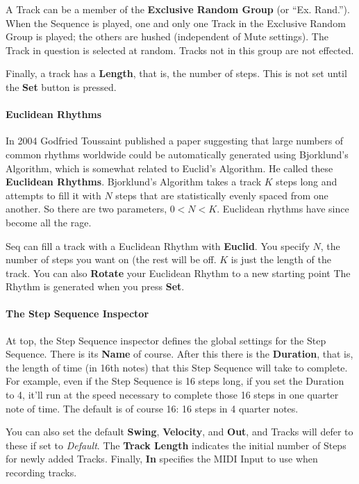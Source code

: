 \documentclass[twoside,10pt]{article}
\begin{document}
A Track can be a member of the {\bf Exclusive Random Group} (or ``Ex. Rand.'').  When the Sequence is played, one and only one Track in the Exclusive Random Group is played; the others are hushed (independent of Mute settings).  The Track in question is selected at random. Tracks not in this group are not effected.

Finally, a track has a {\bf Length}, that is, the number of steps.  This is not set until the {\bf Set} button is pressed.

\paragraph{Euclidean Rhythms}

In 2004 Godfried Toussaint published a paper suggesting that large numbers of common rhythms worldwide could be automatically generated using Bjorklund's Algorithm, which is somewhat related to Euclid's Algorithm.  He called these {\bf Euclidean Rhythms}.  Bjorklund's Algorithm takes a track \(K\) steps long and attempts to fill it with \(N\) steps that are statistically evenly spaced from one another.  So there are two parameters, \(0 < N < K\).  Euclidean rhythms have since become all the rage.

Seq can fill a track with a Euclidean Rhythm with {\bf Euclid}.  You specify \(N\), the number of steps you want on (the rest will be off.  \(K\) is just the length of the track.  You can also {\bf Rotate} your Euclidean Rhythm to a new starting point  The Rhythm is generated when you press {\bf Set}.

\paragraph{The Step Sequence Inspector}

At top, the Step Sequence inspector defines the global settings for the Step Sequence.  There is its {\bf Name} of course.  After this there is the {\bf Duration}, that is, the length of time (in 16th notes) that this Step Sequence will take to complete.  For example, even if the Step Sequence is 16 steps long, if you set the Duration to 4, it'll run at the speed necessary to complete those 16 steps in one quarter note of time.  The default is of course 16: 16 steps in 4 quarter notes.

You can also set the default {\bf Swing}, {\bf Velocity}, and {\bf Out}, and Tracks will defer to these if set to {\it Default}.  The {\bf Track Length} indicates the initial number of Steps for newly added Tracks. Finally, {\bf In} specifies the MIDI Input to use when recording tracks.
\end{document}
